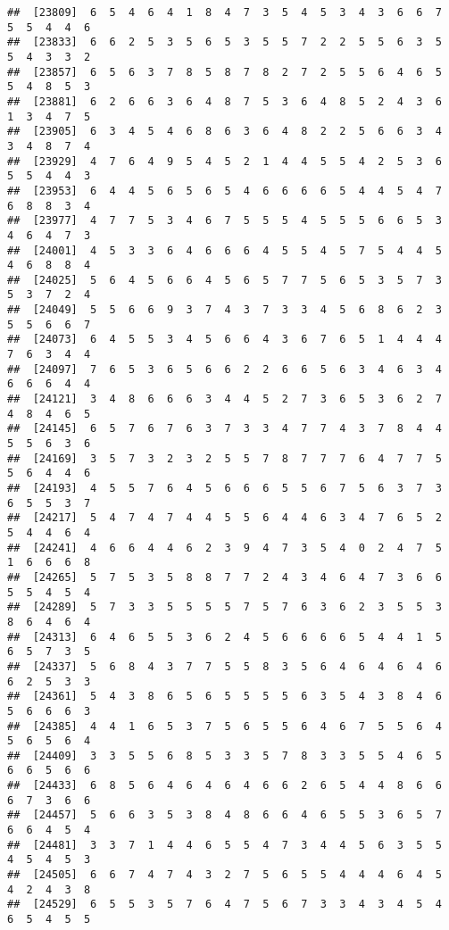 \documentclass[
]{book}
\begin{document}
\begin{verbatim}
##  [23809]  6  5  4  6  4  1  8  4  7  3  5  4  5  3  4  3  6  6  7  5  5  4  4  6
##  [23833]  6  6  2  5  3  5  6  5  3  5  5  7  2  2  5  5  6  3  5  5  4  3  3  2
##  [23857]  6  5  6  3  7  8  5  8  7  8  2  7  2  5  5  6  4  6  5  5  4  8  5  3
##  [23881]  6  2  6  6  3  6  4  8  7  5  3  6  4  8  5  2  4  3  6  1  3  4  7  5
##  [23905]  6  3  4  5  4  6  8  6  3  6  4  8  2  2  5  6  6  3  4  3  4  8  7  4
##  [23929]  4  7  6  4  9  5  4  5  2  1  4  4  5  5  4  2  5  3  6  5  5  4  4  3
##  [23953]  6  4  4  5  6  5  6  5  4  6  6  6  6  5  4  4  5  4  7  6  8  8  3  4
##  [23977]  4  7  7  5  3  4  6  7  5  5  5  4  5  5  5  6  6  5  3  4  6  4  7  3
##  [24001]  4  5  3  3  6  4  6  6  6  4  5  5  4  5  7  5  4  4  5  4  6  8  8  4
##  [24025]  5  6  4  5  6  6  4  5  6  5  7  7  5  6  5  3  5  7  3  5  3  7  2  4
##  [24049]  5  5  6  6  9  3  7  4  3  7  3  3  4  5  6  8  6  2  3  5  5  6  6  7
##  [24073]  6  4  5  5  3  4  5  6  6  4  3  6  7  6  5  1  4  4  4  7  6  3  4  4
##  [24097]  7  6  5  3  6  5  6  6  2  2  6  6  5  6  3  4  6  3  4  6  6  6  4  4
##  [24121]  3  4  8  6  6  6  3  4  4  5  2  7  3  6  5  3  6  2  7  4  8  4  6  5
##  [24145]  6  5  7  6  7  6  3  7  3  3  4  7  7  4  3  7  8  4  4  5  5  6  3  6
##  [24169]  3  5  7  3  2  3  2  5  5  7  8  7  7  7  6  4  7  7  5  5  6  4  4  6
##  [24193]  4  5  5  7  6  4  5  6  6  6  5  5  6  7  5  6  3  7  3  6  5  5  3  7
##  [24217]  5  4  7  4  7  4  4  5  5  6  4  4  6  3  4  7  6  5  2  5  4  4  6  4
##  [24241]  4  6  6  4  4  6  2  3  9  4  7  3  5  4  0  2  4  7  5  1  6  6  6  8
##  [24265]  5  7  5  3  5  8  8  7  7  2  4  3  4  6  4  7  3  6  6  5  5  4  5  4
##  [24289]  5  7  3  3  5  5  5  5  7  5  7  6  3  6  2  3  5  5  3  8  6  4  6  4
##  [24313]  6  4  6  5  5  3  6  2  4  5  6  6  6  6  5  4  4  1  5  6  5  7  3  5
##  [24337]  5  6  8  4  3  7  7  5  5  8  3  5  6  4  6  4  6  4  6  6  2  5  3  3
##  [24361]  5  4  3  8  6  5  6  5  5  5  5  6  3  5  4  3  8  4  6  5  6  6  6  3
##  [24385]  4  4  1  6  5  3  7  5  6  5  5  6  4  6  7  5  5  6  4  5  6  5  6  4
##  [24409]  3  3  5  5  6  8  5  3  3  5  7  8  3  3  5  5  4  6  5  6  6  5  6  6
##  [24433]  6  8  5  6  4  6  4  6  4  6  6  2  6  5  4  4  8  6  6  6  7  3  6  6
##  [24457]  5  6  6  3  5  3  8  4  8  6  6  4  6  5  5  3  6  5  7  6  6  4  5  4
##  [24481]  3  3  7  1  4  4  6  5  5  4  7  3  4  4  5  6  3  5  5  4  5  4  5  3
##  [24505]  6  6  7  4  7  4  3  2  7  5  6  5  5  4  4  4  6  4  5  4  2  4  3  8
##  [24529]  6  5  5  3  5  7  6  4  7  5  6  7  3  3  4  3  4  5  4  6  5  4  5  5

\end{verbatim}
\end{document}
